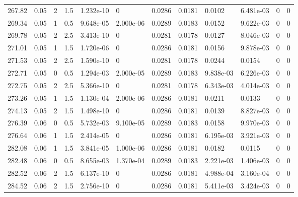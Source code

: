 \documentclass[preview]{standalone}
\begin{document}
{{{{\begin{tabular}{L{1.2cm}C{1.2cm} C{0.3cm}C{0.5cm} C{1.4cm}C{1.4cm} C{1.4cm}C{1.4cm} C{1.6cm}C{1.6cm} C{1.6cm}C{1.6cm}}
  267.82  &  0.05  & 2     & 1.5 &  1.232e-10  & 0  &  0.0286&   0.0181& 0.0102 & 6.481e-03   &  0 & 0  \\ 
  269.34  &  0.05  & 1     & 0.5 &  9.648e-05  & 2.000e-06  &  0.0289&   0.0183& 0.0152 & 9.622e-03   &  0 & 0  \\ 
  269.78  &  0.05  & 2     & 2.5 &  3.413e-10  & 0  &  0.0281&   0.0178& 0.0127 & 8.046e-03   &  0 & 0  \\ 
  271.01  &  0.05  & 1     & 1.5 &  1.720e-06  & 0  &  0.0286&   0.0181& 0.0156 & 9.878e-03   &  0 & 0  \\ 
  271.53  &  0.05  & 2     & 2.5 &  1.590e-10  & 0  &  0.0281&   0.0178& 0.0244 & 0.0154   &  0 & 0  \\ 
  272.71  &  0.05  & 0     & 0.5 &  1.294e-03  & 2.000e-05  &  0.0289&   0.0183& 9.838e-03 & 6.226e-03   &  0 & 0  \\ 
  272.75  &  0.05  & 2     & 2.5 &  5.366e-10  & 0  &  0.0281&   0.0178& 6.343e-03 & 4.014e-03   &  0 & 0  \\ 
  273.26  &  0.05  & 1     & 1.5 &  1.130e-04  & 2.000e-06  &  0.0286&   0.0181& 0.0211 & 0.0133   &  0 & 0  \\ 
  274.13  &  0.05  & 2     & 1.5 &  1.498e-10  & 0  &  0.0286&   0.0181& 0.0139 & 8.827e-03   &  0 & 0  \\ 
  276.39  &  0.06  & 0     & 0.5 &  5.732e-03  & 9.100e-05  &  0.0289&   0.0183& 0.0158 & 9.970e-03   &  0 & 0  \\ 
  276.64  &  0.06  & 1     & 1.5 &  2.414e-05  & 0  &  0.0286&   0.0181& 6.195e-03 & 3.921e-03   &  0 & 0  \\ 
  282.08  &  0.06  & 1     & 1.5 &  3.841e-05  & 1.000e-06  &  0.0286&   0.0181& 0.0182 & 0.0115   &  0 & 0  \\ 
  282.48  &  0.06  & 0     & 0.5 &  8.655e-03  & 1.370e-04  &  0.0289&   0.0183& 2.221e-03 & 1.406e-03   &  0 & 0  \\ 
  282.52  &  0.06  & 2     & 1.5 &  6.137e-10  & 0  &  0.0286&   0.0181& 4.988e-04 & 3.160e-04   &  0 & 0  \\ 
  284.52  &  0.06  & 2     & 1.5 &  2.756e-10  & 0  &  0.0286&   0.0181& 5.411e-03 & 3.424e-03   &  0 & 0  \\ 
\hline 
\end{tabular} 

}}}}
\end{document}

